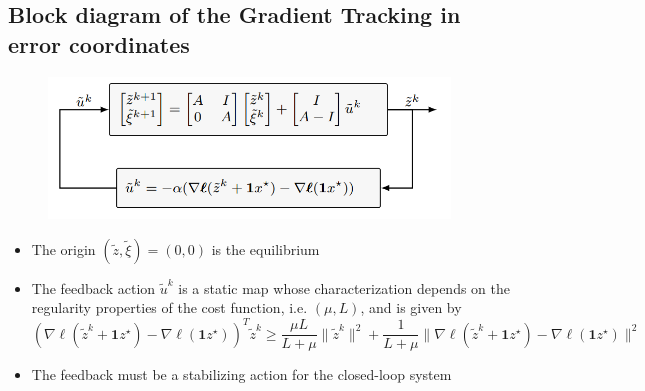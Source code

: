 \documentclass{book}
\newcommand{\fatone}{\boldsymbol{1}}
\theoremstyle{theoremv2}
\theoremstyle{defv2}
\theoremstyle{remark}
\theoremstyle{remark}
\theoremstyle{definition}
\theoremstyle{definition}
\begin{document}
\subsection{Block diagram of the Gradient Tracking in error coordinates}
\begin{figure}[h]
    \begin{center}
        \includegraphics[width=0.95\textwidth]{figures/trackerr}
    \end{center}
\end{figure}
\begin{itemize}
    \item The origin $(\tilde{z},\tilde{\xi}) = (0,0)$ is the equilibrium
    \item The feedback action $\tilde{u}^k$ is a static map whose characterization depends on the regularity properties of the cost function, i.e. $(\mu,L)$, and is given by
        \[
            (\nabla\boldsymbol{\ell}(\tilde{z}^k+\fatone z^\star)-\nabla\boldsymbol{\ell}(\fatone z^\star))^T \tilde{z}^k \geq \displaystyle\frac{\mu L}{L + \mu}\|\tilde{z}^k\|^2 + \displaystyle\frac{1}{L + \mu}\|\nabla\boldsymbol{\ell}(\tilde{z}^k+\fatone z^\star)-\nabla\boldsymbol{\ell}(\fatone z^\star)\|^2
        \]
        \item The feedback must be a stabilizing action for the closed-loop system
\end{itemize}
\end{document}
